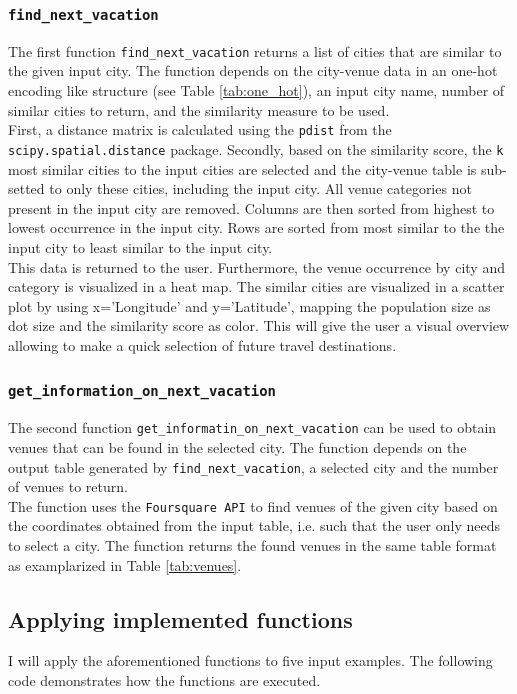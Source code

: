 \documentclass[11pt,a4paper,final]{article}
\begin{document}
\subsubsection*{\texttt{find\_next\_vacation}}
The first function \texttt{find\_next\_vacation} returns a list of cities that are similar to the given input city. The function depends on the city-venue data in an one-hot encoding like structure (see Table \ref{tab:one_hot}), an input city name, number of similar cities to return, and the similarity measure to be used. \\  
First, a distance matrix is calculated using the \texttt{pdist} from the \texttt{scipy.spatial.distance} package. Secondly, based on the similarity score, the \texttt{k} most similar cities to the input cities are selected and the city-venue table is sub-setted to only these cities, including the input city. All venue categories not present in the input city are removed. Columns are then sorted from highest to lowest occurrence in the input city. Rows are sorted from most similar to the the input city to least similar to the input city. \\  
This data is returned to the user. Furthermore, the venue occurrence by city and category is visualized in a heat map. The similar cities are visualized in a scatter plot by using x='Longitude' and y='Latitude', mapping the population size as dot size and the similarity score as color. This will give the user a visual overview allowing to make a quick selection of future travel destinations.

\subsubsection*{\texttt{get\_information\_on\_next\_vacation}}
The second function \texttt{get\_informatin\_on\_next\_vacation} can be used to obtain venues that can be found in the selected city. The function depends on the output table generated by \texttt{find\_next\_vacation}, a selected city and the number of venues to return. \\
The function uses the \texttt{Foursquare API} to find venues of the given city based on the coordinates obtained from the input table, i.e. such that the user only needs to select a city. The function returns the found venues in the same table format as examplarized in Table \ref{tab:venues}.

\subsection{Applying implemented functions}
I will apply the aforementioned functions to five input examples. The following code demonstrates how the functions are executed.
\end{document}

